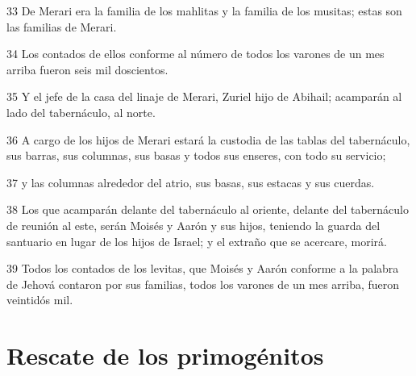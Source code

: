 \par 33 De Merari era la familia de los mahlitas y la familia de los musitas; estas son las familias de Merari.
\par 34 Los contados de ellos conforme al número de todos los varones de un mes arriba fueron seis mil doscientos.
\par 35 Y el jefe de la casa del linaje de Merari, Zuriel hijo de Abihail; acamparán al lado del tabernáculo, al norte.
\par 36 A cargo de los hijos de Merari estará la custodia de las tablas del tabernáculo, sus barras, sus columnas, sus basas y todos sus enseres, con todo su servicio;
\par 37 y las columnas alrededor del atrio, sus basas, sus estacas y sus cuerdas.
\par 38 Los que acamparán delante del tabernáculo al oriente, delante del tabernáculo de reunión al este, serán Moisés y Aarón y sus hijos, teniendo la guarda del santuario en lugar de los hijos de Israel; y el extraño que se acercare, morirá.
\par 39 Todos los contados de los levitas, que Moisés y Aarón conforme a la palabra de Jehová contaron por sus familias, todos los varones de un mes arriba, fueron veintidós mil.

\section*{Rescate de los primogénitos}

